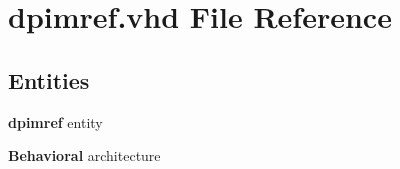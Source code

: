 \section{dpimref.\-vhd File Reference}
\label{dpimref_8vhd}
\subsection*{Entities}
\begin{DoxyCompactItemize}
\item 
{\bf dpimref} entity
\item 
{\bf Behavioral} architecture
\end{DoxyCompactItemize}

